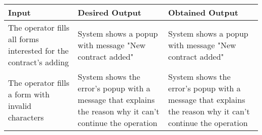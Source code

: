 {{{			\begin{table}[h]
			\begin{tabular}{|p{4cm}|p{5cm}|p{5cm}|}
			\hline
			\centering \vspace{1mm} \bfseries{Input} \vspace{1mm} & \vspace{1mm} \bfseries{Desired Output} \vspace{1mm} & \vspace{1mm} \bfseries{Obtained Output} \vspace{1mm}\\
			\hline
				\vspace{1mm} The operator fills all forms interested for the contract's adding \vspace{1mm} &
				\vspace{1mm} System shows a popup with message "New contract added" \vspace{1mm} & 
				\vspace{1mm} System shows a popup with message "New contract added" \vspace{1mm} \\
			\hline
				\vspace{1mm} The operator fills a form with invalid characters \vspace{1mm} &
				\vspace{1mm} System shows the error's popup with a message that explains the reason why it can't continue the operation \vspace{1mm} & 
				\vspace{1mm} System shows the error's popup with a message that explains the reason why it can't continue the operation \vspace{1mm} \\
			\hline
			\end{tabular}
			\end{table}
		}
		\clearpage

}}
